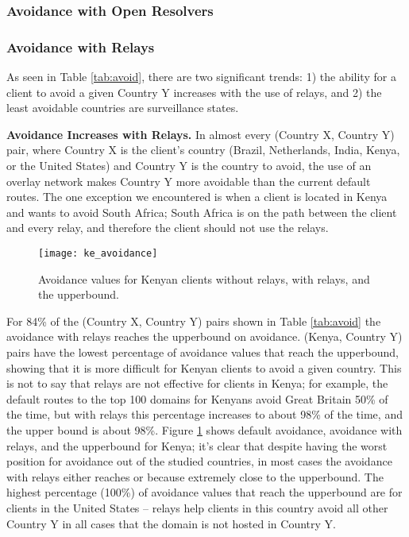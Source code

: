 \subsubsection{Avoidance with Open Resolvers}

\subsubsection{Avoidance with Relays}
As seen in Table \ref{tab:avoid}, there are two significant trends: 1) the ability for a client to avoid a given Country Y increases with the use of relays, and 2) the least avoidable countries are surveillance states.

{\bf Avoidance Increases with Relays.}
In almost every (Country X, Country Y) pair, where Country X is the client's country (Brazil, Netherlands, India, Kenya, or the United States) and Country Y is the country to avoid, the use of an overlay network makes Country Y more avoidable than the current default routes.  The one exception we encountered is when a client is located in Kenya and wants to avoid South Africa; South Africa is on the path between the client and every relay, and therefore the client should not use the relays.  

\begin{figure}
\centering
\texttt{[image: ke\_avoidance]}
\caption{Avoidance values for Kenyan clients without relays, with relays, and the upperbound.}
\label{fig:ke_avoidance}
\end{figure}

For 84\% of the (Country X, Country Y) pairs shown in Table \ref{tab:avoid} the avoidance with relays reaches the upperbound on avoidance.  (Kenya, Country Y) pairs have the lowest percentage of avoidance values that reach the upperbound, showing that it is more difficult for Kenyan clients to avoid a given country.  This is not to say that relays are not effective for clients in Kenya; for example, the default routes to the top 100 domains for Kenyans avoid Great Britain 50\% of the time, but with relays this percentage increases to about 98\% of the time, and the upper bound is about 98\%. Figure \ref{fig:ke_avoidance} shows default avoidance, avoidance with relays, and the upperbound for Kenya; it's clear that despite having the worst position for avoidance out of the studied countries, in most cases the avoidance with relays either reaches or because extremely close to the upperbound.  The highest percentage (100\%) of avoidance values that reach the upperbound are for clients in the United States -- relays help clients in this country avoid all other Country Y in all cases that the domain is not hosted in Country Y.  

